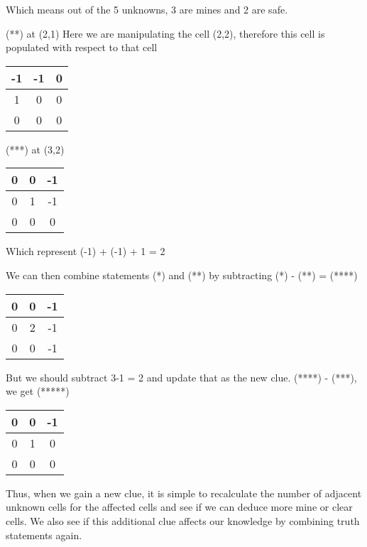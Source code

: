 \documentclass[a4paper]{article}
\begin{document}
Which means out of the 5 unknowns, 3 are mines and 2 are safe.

(**) at (2,1)
Here we are manipulating the cell (2,2), therefore this cell is populated with respect to that cell

\begin{center}
\begin{tabular}{|c|c|c|}
\hline
-1 & -1 & 0\\
\hline
 1 &  0 &  0\\
\hline
 0 &  0 &  0\\
\hline
\end{tabular}
\end{center}


(***) at (3,2)

\begin{center}
\begin{tabular}{|c|c|c|}
\hline
 0 &  0 & -1\\
\hline
 0 &  1 & -1\\
\hline
 0 &  0 &  0\\
\hline
\end{tabular}
\end{center}

Which represent 
(-1) + (-1) + 1 = 2

We can then combine statements (*) and (**) by subtracting 
(*) - (**) = (****)
\begin{center}
\begin{tabular}{|c|c|c|}
\hline
 0 &  0 & -1\\
\hline
 0 &  2 & -1\\
\hline
 0 &  0 & -1\\
\hline
\end{tabular}
\end{center}

But we should subtract 3-1 = 2 and update that as the new clue.
(****) - (***), we get (*****)
\begin{center}
\begin{tabular}{|c|c|c|}
\hline
 0 &  0 & -1\\
\hline
 0 &  1 & 0\\
\hline
 0 &  0 &  0\\
\hline
\end{tabular}
\end{center}

Thus, when we gain a new clue, it is simple to recalculate the number of adjacent unknown cells  for the affected cells and see if we can deduce more mine or clear cells. We also see if this additional clue affects our knowledge by combining truth statements again.
\end{document}
